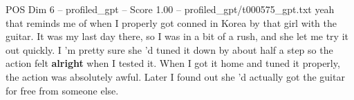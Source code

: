 \begin{textsample}{POS Dim 6 – profiled\_gpt – Score 1.00 – profiled\_gpt/t000575\_gpt.txt}  \label{ex:f6_pos_039}
yeah that reminds me of when I properly got conned in Korea by that girl with the guitar.
It was my last day there, so I was in a bit of a rush, and she let me try it out quickly.
I ’m pretty sure she ’d tuned it down by about half a step so the action felt \textbf{alright} when I tested it.
When I got it home and tuned it properly, the action was absolutely awful.
Later I found out she ’d actually got the guitar for free from someone else.

\end{textsample}
